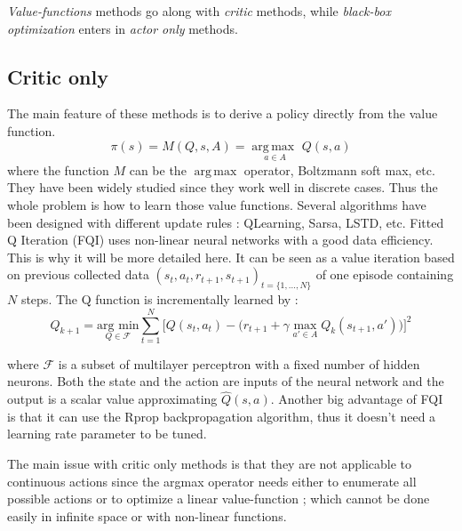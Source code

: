 {\em Value-functions} methods go along with {\em critic} methods, while {\em black-box optimization}
enters in {\em actor only} methods.

\subsection{Critic only}

The main feature of these methods is to derive a policy directly from the value function.
\begin{equation}
 \pi(s) = M(Q, s, A) = \underset{a \in A}{\operatorname{arg\,max\ }} Q(s,a)
\end{equation}
where the function $M$ can be the $\operatorname{arg\,max}$ operator, Boltzmann soft max, etc.
They have been widely studied since they work well in discrete cases.
Thus the whole problem is how to learn those value functions.
Several algorithms have been designed with different update rules : QLearning, Sarsa, LSTD, etc.
Fitted Q Iteration (FQI) \cite{Riedmiller2005} uses non-linear neural networks with a good data efficiency.
This is why it will be more detailed here.
It can be seen as a value iteration\cite{Howard1960} based on previous collected data $(s_t, a_t,r_{t+1}, s_{t+1})_{t=\{1,...,N\}}$ of one episode containing $N$ steps.
The Q function is incrementally learned by : 
\begin{equation}
 Q_{k+1} = \underset{Q \in \mathcal{F}}{\text{arg min}} \sum_{t=1}^{N} \Big[ Q(s_t, a_t) - \big( r_{t+1} + \gamma \underset{a' \in A}{\text{ max }} Q_k(s_{t+1}, a') \big) \Big]^2
\end{equation}


where $\mathcal{F}$ is a subset of multilayer perceptron with a fixed number of hidden neurons.
Both the state and the action are inputs of the neural network and the output is a scalar value
approximating $\hat{Q}(s,a)$. Another big advantage of FQI is that it can use
the Rprop \cite{Igel2000, Riedmiller1992} backpropagation algorithm, thus it doesn't need a learning rate parameter
to be tuned.

The main issue with critic only methods is that they are not applicable to continuous actions since
the argmax operator needs either to enumerate all possible actions or to optimize a linear value-function
; which cannot be done easily in infinite space or with non-linear functions.

